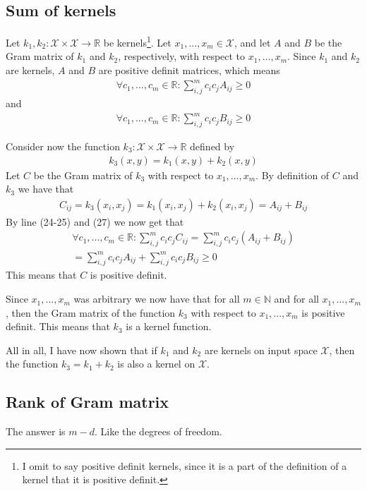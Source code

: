 \documentclass[12pt]{article}
\begin{document}
\subsection{Sum of kernels}

Let $k_1, k_2: \mathcal{X}\times \mathcal{X} \to \mathbb{R}$ be kernels\footnote{I omit to say positive definit kernels, since it is a part of the definition of a kernel that it is positive definit.}. Let $x_1,...,x_m \in \mathcal{X}$, and let $A$ and $B$ be the Gram matrix of $k_1$ and $k_2$, respectively, with respect to $x_1,...,x_m$. Since $k_1$ and $k_2$ are kernels, $A$ and $B$ are positive definit matrices, which means
\begin{align}
\forall c_1,...,c_m \in \mathbb{R}: \sum_{i,j}^m c_i c_j A_{ij} \geq 0
\end{align}
and 
\begin{align}
\forall c_1,...,c_m \in \mathbb{R}: \sum_{i,j}^m c_i c_j B_{ij} \geq 0
\end{align}

Consider now the function $k_3:\mathcal{X}\times \mathcal{X} \to \mathbb{R}$ defined by
\begin{align}
k_3(x,y) = k_1(x,y) + k_2(x,y)
\end{align}
Let $C$ be the Gram matrix of $k_3$ with respect to $x_1,...,x_m$. By definition of $C$ and $k_3$ we have that
\begin{align}
C_{ij} = k_3(x_i,x_j) = k_1(x_i,x_j) + k_2(x_i,x_j) = A_{ij} + B_{ij}
\end{align} 
By line (24-25) and (27) we now get that
\begin{align}
\forall c_1,...,c_m \in \mathbb{R}: \sum_{i,j}^m c_i c_j C_{ij} = \sum_{i,j}^m c_i c_j (A_{ij} + B_{ij}) \\
= \sum_{i,j}^m c_i c_jA_{ij} + \sum_{i,j}^m c_i c_jB_{ij} \geq 0
\end{align}
This means that $C$ is positive definit. 

Since $x_1,...,x_m$ was arbitrary we now have that for all $m \in \mathbb{N}$ and for all $x_1,...,x_m$, then the Gram matrix of the function $k_3$ with respect to $x_1,...,x_m$ is positive definit. This means that $k_3$ is a kernel function.

All in all, I have now shown that if $k_1$ and $k_2$ are kernels on input space $\mathcal{X}$, then the function $k_3 = k_1 + k_2$ is also a kernel on $\mathcal{X}$.

\subsection{Rank of Gram matrix}

The answer is $m-d$. Like the degrees of freedom.
\end{document}
